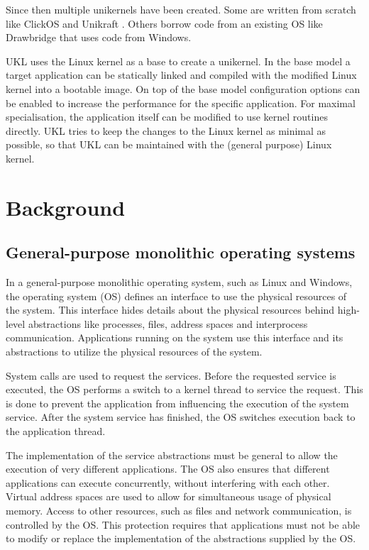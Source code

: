 \documentclass[10pt,twocolumn,a4paper]{article}
\begin{document}
  Since then multiple unikernels have been created. Some are written from scratch like
  ClickOS \cite{martins2014} and Unikraft \cite{kuenzer21}.
  Others borrow code from an existing OS like Drawbridge \cite{porter11} 
  that uses code from Windows.

  UKL uses the Linux kernel as a base to create a unikernel.
  In the base model a target application can be statically linked and compiled with
  the modified Linux kernel into a bootable image.
  On top of the base model configuration options can be enabled to increase the performance
  for the specific application.
  For maximal specialisation, the application itself can be modified to use kernel routines
  directly.
  UKL tries to keep the changes to the Linux kernel as minimal as possible,
  so that UKL can be maintained with the (general purpose) Linux kernel.
  

\section{Background}\label{sec:background}
  \subsection{General-purpose monolithic operating systems}
    In a general-purpose monolithic operating system, such as Linux and Windows,
    the operating system (OS) defines an interface to use the physical resources
    of the system. 
    This interface hides details about the physical resources behind
    high-level abstractions like processes, files, address spaces 
    and interprocess communication.
    Applications running on the system use this interface and its abstractions
    to utilize the physical resources of the system.

    System calls are used to request the services.
    Before the requested service is executed, the OS performs a switch to a kernel thread
    to service the request.
    This is done to prevent the application from influencing the execution of the system service.
    After the system service has finished, the OS switches execution back to the application thread.

    The implementation of the service abstractions must be general to allow the execution 
    of very different applications.
    The OS also ensures that different applications can execute concurrently, 
    without interfering with each other. 
    Virtual address spaces are used to allow for simultaneous usage of physical memory.
    Access to other resources, such as files and network communication, is controlled
    by the OS.
    This protection requires that applications must not be able
    to modify or replace the implementation of the abstractions supplied by the OS.
\end{document}
